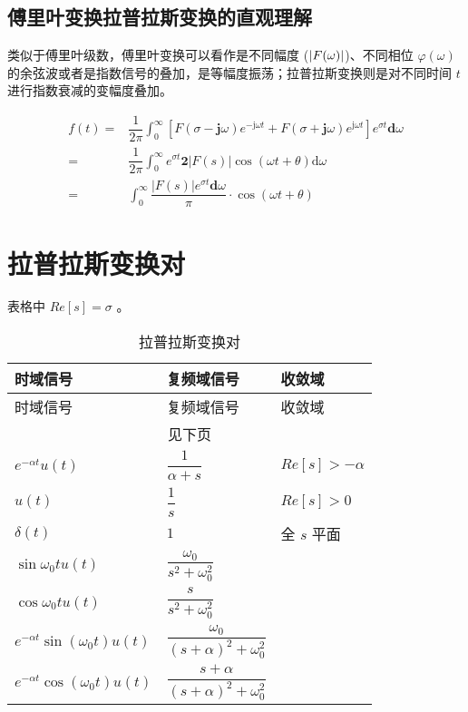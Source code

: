 \documentclass[cn,11pt,chinese,black,simple]{../elegantbook}
\begin{document}
\subsection{傅里叶变换拉普拉斯变换的直观理解}

类似于傅里叶级数，傅里叶变换可以看作是不同幅度 (\(\left| F(\omega) \right|\))、不同相位 \(\varphi(\omega)\) 的余弦波或者是指数信号的叠加，是等幅度振荡；拉普拉斯变换则是对不同时间 \(t\) 进行指数衰减的变幅度叠加。

\[
    \begin{aligned}
        f(t)=& \dfrac{1}{2 \pi} \int_{0}^{\infty}\left[F(\sigma-\mathbf{j} \omega) e^{-\mathrm{j} \omega t}+F(\sigma+\mathbf{j} \omega) e^{\mathrm{j} \omega t}\right] e^{\sigma t} \mathbf{d} \omega \\
        =& \dfrac{1}{2 \pi} \int_{0}^{\infty} e^{\sigma t} \mathbf{2}|F(s)| \cos (\omega t+\theta) \mathrm{d} \omega \\
        =&\int_{0}^{\infty} \dfrac{|F(s)| e^{\sigma t} \mathbf{d} \omega}{\pi} \cdot \cos (\omega t+\theta)
    \end{aligned}\]

\section{拉普拉斯变换对}

表格中 \(Re[s] = \sigma\) 。


\begin{longtable}{lll} 
    \caption{拉普拉斯变换对} \\ 
    \toprule
    时域信号 & 复频域信号 & 收敛域\\ 
    \midrule
    \endfirsthead
    
    \toprule
    时域信号 & 复频域信号 & 收敛域\\ 
    \midrule
    \endhead 
  
    \hline
    \multicolumn{3}{c}{见下页}\\   \bottomrule
    \endfoot
  
    \bottomrule
    \endlastfoot
  
    \(e^{-\alpha t}u(t)\) & \(\dfrac{1}{\alpha + s}\) & \(Re[s] > -\alpha\) \\
    \(u(t)\) & \(\dfrac{1}{s}\) & \(Re[s] > 0\) \\
    \(\delta(t)\) & \(1\) & 全 \(s\) 平面 \\
    \(\sin \omega_0 t u(t)\) & \(\dfrac{\omega_0}{s^2 + \omega_0^2}\) & \\
    \(\cos \omega_0 t u(t)\) & \(\dfrac{s}{s^2 + \omega_0^2}\) & \\
    \(e^{-\alpha t}\sin (\omega_0 t) u(t)\) & \(\dfrac{\omega_0}{(s + \alpha)^2 + \omega_0^2}\) & \\
    \(e^{-\alpha t}\cos (\omega_0 t) u(t)\) & \(\dfrac{s + \alpha}{(s + \alpha)^2 + \omega_0^2}\) &\\
    
\end{longtable}
\end{document}
